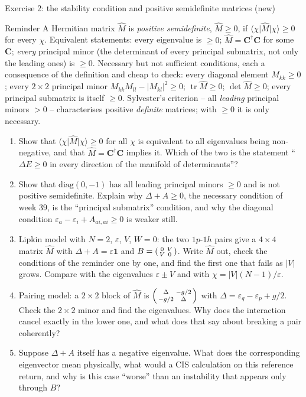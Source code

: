 \documentclass[aspectratio=169,10pt]{beamer}
\newcommand{\ket}[1]{\vert #1\rangle}
\newcommand{\bra}[1]{\langle #1\vert}
\DeclareMathOperator{\tr}{tr}
\begin{document}
\begin{frame}{Exercise 2: the stability condition and positive semidefinite matrices (new)}
  \scriptsize
  \begin{block}{Reminder}
    A Hermitian matrix $\hat M$ is \emph{positive semidefinite}, $\hat M\ge0$, if $\bra{\chi}\hat M\ket{\chi}\ge0$ for every $\chi$. Equivalent statements: every eigenvalue is $\ge0$; $\hat M=\bm C^{\dagger}\bm C$ for some $\bm C$; \emph{every} principal minor (the determinant of every principal submatrix, not only the leading ones) is $\ge0$. \alert{Necessary but not sufficient} conditions, each a consequence of the definition and cheap to check: every diagonal element $M_{kk}\ge0$; every $2\times2$ principal minor $M_{kk}M_{ll}-|M_{kl}|^2\ge0$; $\tr\hat M\ge0$; $\det\hat M\ge0$; every principal submatrix is itself $\ge0$. Sylvester's criterion -- all \emph{leading} principal minors $>0$ -- characterises positive \emph{definite} matrices; with $\ge0$ it is only necessary.
  \end{block}
  \begin{enumerate}
    \item[a)] Show that $\bra{\chi}\hat M\ket{\chi}\ge0$ for all $\chi$ is equivalent to all eigenvalues being non-negative, and that $\hat M=\bm C^{\dagger}\bm C$ implies it. Which of the two is the statement ``$\Delta E\ge0$ in every direction of the manifold of determinants''?
    \item[b)] Show that $\mathrm{diag}(0,-1)$ has all leading principal minors $\ge0$ and is not positive semidefinite. Explain why $\Delta+A\ge0$, the necessary condition of week 39, is the ``principal submatrix'' condition, and why the diagonal condition $\varepsilon_a-\varepsilon_i+A_{ai,ai}\ge0$ is weaker still.
    \item[c)] Lipkin model with $N=2$, $\varepsilon$, $V$, $W=0$: the two $1p$-$1h$ pairs give a $4\times4$ matrix $\hat M$ with $\Delta+A=\varepsilon\bm 1$ and $B=\begin{psmallmatrix}0&V\\V&0\end{psmallmatrix}$. Write $\hat M$ out, check the conditions of the reminder one by one, and find the first one that fails as $|V|$ grows. Compare with the eigenvalues $\varepsilon\pm V$ and with $\chi=|V|(N-1)/\varepsilon$.
    \item[d)] Pairing model: a $2\times2$ block of $\hat M$ is $\begin{psmallmatrix}\Delta&-g/2\\-g/2&\Delta\end{psmallmatrix}$ with $\Delta=\varepsilon_q-\varepsilon_p+g/2$. Check the $2\times2$ minor and find the eigenvalues. Why does the interaction cancel exactly in the lower one, and what does that say about breaking a pair coherently?
    \item[e)] Suppose $\Delta+A$ itself has a negative eigenvalue. What does the corresponding eigenvector mean physically, what would a CIS calculation on this reference return, and why is this case ``worse'' than an instability that appears only through $B$?
  \end{enumerate}
\end{frame}
\end{document}
